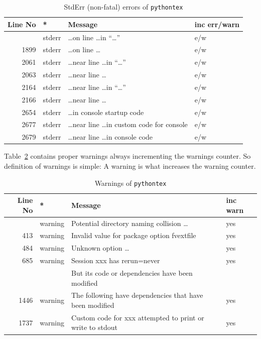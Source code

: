 \documentclass[a4paper, english]{article}%
\begin{document}
{\small
\begin{longtable}{rlll}
  \toprule
  Line No       & * & Message & inc err/warn  \\
  \midrule
  \midrule
  \endfirsthead%
  \bottomrule
  \caption{\label{tab:pytexIOErr} StdErr (non-fatal) errors of \texttt{pythontex}  }
  \endlastfoot%
  1899 & stderr & \dots on line \dots in ``\dots''                               & e/w \\
  1899 & stderr & \dots on line \dots                                            & e/w \\
  2061 & stderr & \dots near line \dots in ``\dots''                             & e/w \\
  2063 & stderr & \dots near line \dots                                          & e/w \\
  2164 & stderr & \dots near line \dots in ``\dots''                             & e/w \\
  2166 & stderr & \dots near line \dots                                          & e/w \\
  2654 & stderr & \dots in console startup code                                  & e/w \\
  2677 & stderr & \dots near line \dots in custom code for console               & e/w \\
  2679 & stderr & \dots near line \dots in console code                          & e/w \\
\end{longtable}
} %

Table~\ref{tab:pytexWarn} contains proper warnings 
always incrementing the warnings counter. 
So definition of warnings is simple: A warning is what increases the warning counter. 

\begin{longtable}{rlll}
  \toprule
  Line No       & * & Message & inc warn \\
  \endfirsthead%
  \bottomrule
  \caption{\label{tab:pytexWarn} Warnings of \texttt{pythontex}  }
  \endlastfoot%
   340 & warning & Potential directory naming collision \dots  & yes \\%
   413 & warning & Invalid value for package option fvextfile  & yes \\%
   484 & warning & Unknown option \dots                        & yes \\%
   685 & warning & Session xxx has rerun=never                 & yes \\%
       &         & But its code or dependencies have been modified & \\
  1446 & warning & The following have dependencies that have been modified & yes \\%
  1737 & warning & Custom code for xxx attempted to print or write to stdout & yes \\%
   \end{longtable}
\end{document}
